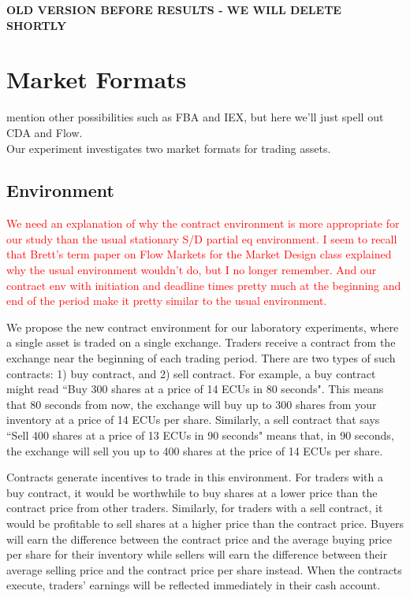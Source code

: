\newpage

\textbf{OLD VERSION BEFORE RESULTS - WE WILL DELETE SHORTLY}

\section{Market Formats} \label{market_formats}
mention other possibilities such as FBA and IEX, but here we'll just spell out CDA and Flow. \\

Our experiment investigates two market formats for trading assets. 

\subsection{Environment}
\textcolor{red}{We need an explanation of why the contract environment is more appropriate for our study than the usual stationary S/D partial eq environment.
I seem to recall that Brett's term paper on Flow Markets for the Market Design class explained why the usual environment wouldn't do, but I no longer remember. And our contract env with initiation and deadline times pretty much at the beginning and end of the period make it pretty similar to the usual environment.}

We propose the new contract environment for our laboratory experiments, where a single asset is traded on a single exchange. Traders receive a contract from the exchange near the beginning of each trading period. There are two types of such contracts: 1) buy contract, and 2) sell contract. For example, a buy contract might read ``Buy 300 shares at a price of 14 ECUs in 80 seconds". This means that 80 seconds from now, the exchange will buy up to 300 shares from your inventory at a price of 14 ECUs per share. Similarly, a sell contract that says ``Sell 400 shares at a price of 13 ECUs in 90 seconds" means that, in 90 seconds, the exchange will sell you up to 400 shares at the price of 14 ECUs per share. 

Contracts generate incentives to trade in this environment. For traders with a buy contract, it would be worthwhile to buy shares at a lower price than the contract price from other traders. Similarly, for traders with a sell contract, it would be profitable to sell shares at a higher price than the contract price.
Buyers will earn the difference between the contract price and the average buying price per share for their inventory while sellers will earn the difference between their average selling price and the contract price per share instead. When the contracts execute, traders' earnings will be reflected immediately in their cash account. 

